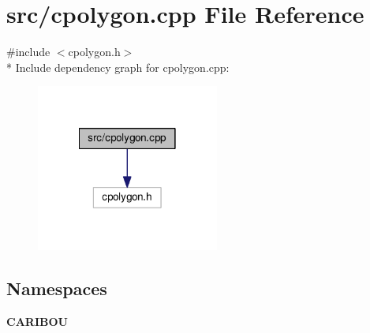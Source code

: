 \section{src/cpolygon.cpp File Reference}
\label{cpolygon_8cpp}
{\ttfamily \#include $<$cpolygon.\-h$>$}\\*
Include dependency graph for cpolygon.\-cpp\-:\nopagebreak
\begin{figure}[H]
\begin{center}
\leavevmode
\includegraphics[width=170pt]{cpolygon_8cpp__incl}
\end{center}
\end{figure}
\subsection*{Namespaces}
\begin{DoxyCompactItemize}
\item 
{\bf C\-A\-R\-I\-B\-O\-U}
\end{DoxyCompactItemize}
